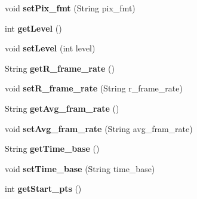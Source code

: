 \begin{DoxyCompactItemize}
\item 
\hypertarget{classjson__objects_1_1_stream_a75d3b26ef4f08d6681d2c6164665281f}{
void {\bfseries setPix\_\-fmt} (String pix\_\-fmt)}
\label{classjson__objects_1_1_stream_a75d3b26ef4f08d6681d2c6164665281f}

\item 
\hypertarget{classjson__objects_1_1_stream_a84b04398f212dd18476c18132ed5a577}{
int {\bfseries getLevel} ()}
\label{classjson__objects_1_1_stream_a84b04398f212dd18476c18132ed5a577}

\item 
\hypertarget{classjson__objects_1_1_stream_a1dbae4cecc2ab59e0edfb7ee4711fda8}{
void {\bfseries setLevel} (int level)}
\label{classjson__objects_1_1_stream_a1dbae4cecc2ab59e0edfb7ee4711fda8}

\item 
\hypertarget{classjson__objects_1_1_stream_af6d5a935989420e130e25e041c1b4457}{
String {\bfseries getR\_\-frame\_\-rate} ()}
\label{classjson__objects_1_1_stream_af6d5a935989420e130e25e041c1b4457}

\item 
\hypertarget{classjson__objects_1_1_stream_a79d790806a8c1f5f3d5a1bcae7ae1426}{
void {\bfseries setR\_\-frame\_\-rate} (String r\_\-frame\_\-rate)}
\label{classjson__objects_1_1_stream_a79d790806a8c1f5f3d5a1bcae7ae1426}

\item 
\hypertarget{classjson__objects_1_1_stream_a1cc6a2895f5730cb6a369cb559aadae0}{
String {\bfseries getAvg\_\-fram\_\-rate} ()}
\label{classjson__objects_1_1_stream_a1cc6a2895f5730cb6a369cb559aadae0}

\item 
\hypertarget{classjson__objects_1_1_stream_a5992edd6956007835716f07f48e85b4d}{
void {\bfseries setAvg\_\-fram\_\-rate} (String avg\_\-fram\_\-rate)}
\label{classjson__objects_1_1_stream_a5992edd6956007835716f07f48e85b4d}

\item 
\hypertarget{classjson__objects_1_1_stream_a3499efa26dc7ec9a377096b2537f4d7a}{
String {\bfseries getTime\_\-base} ()}
\label{classjson__objects_1_1_stream_a3499efa26dc7ec9a377096b2537f4d7a}

\item 
\hypertarget{classjson__objects_1_1_stream_afc31f1ac7496acfa5f4f86e08df47e5b}{
void {\bfseries setTime\_\-base} (String time\_\-base)}
\label{classjson__objects_1_1_stream_afc31f1ac7496acfa5f4f86e08df47e5b}

\item 
\hypertarget{classjson__objects_1_1_stream_a72c4c7067b4d5213c814256341fbe7e5}{
int {\bfseries getStart\_\-pts} ()}
\label{classjson__objects_1_1_stream_a72c4c7067b4d5213c814256341fbe7e5}


\end{DoxyCompactItemize}
